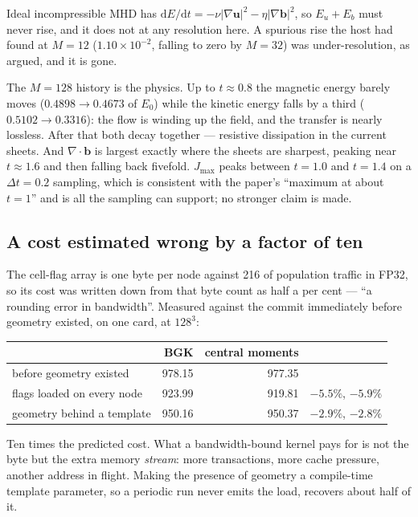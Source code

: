 \documentclass[11pt,a4paper]{article}
\newcommand{\uu}{\bm{u}}
\newcommand{\bb}{\bm{b}}
\newcommand{\e}[1]{\times 10^{#1}}
\begin{document}
Ideal incompressible MHD has $\mathrm{d}E/\mathrm{d}t = -\nu|\nabla\uu|^2 -
\eta|\nabla\bb|^2$, so $E_u + E_b$ must never rise, and it does not at any
resolution here. A spurious rise the host had found at $M=12$ ($1.10\e{-2}$,
falling to zero by $M=32$) was under-resolution, as argued, and it is gone.

The $M=128$ history is the physics. Up to $t\approx0.8$ the magnetic energy barely
moves ($0.4898 \to 0.4673$ of $E_0$) while the kinetic energy falls by a third
($0.5102 \to 0.3316$): the flow is winding up the field, and the transfer is
nearly lossless. After that both decay together --- resistive dissipation in the
current sheets. And $\nabla\!\cdot\!\bb$ is largest exactly where the sheets are
sharpest, peaking near $t\approx1.6$ and then falling back fivefold.
$J_{\max}$ peaks between $t=1.0$ and $t=1.4$ on a $\Delta t = 0.2$ sampling, which
is consistent with the paper's ``maximum at about $t=1$'' and is all the sampling
can support; no stronger claim is made.

\subsection{A cost estimated wrong by a factor of ten}

The cell-flag array is one byte per node against 216 of population traffic in
FP32, so its cost was written down from that byte count as half a per cent --- ``a
rounding error in bandwidth''. Measured against the commit immediately before
geometry existed, on one card, at $128^3$:

\begin{center}\small
\begin{tabular}{lrrr}
\toprule
 & BGK & central moments & \\
\midrule
before geometry existed   & 978.15 & 977.35 & \\
flags loaded on every node& 923.99 & 919.81 & $-5.5\%$, $-5.9\%$ \\
geometry behind a template& 950.16 & 950.37 & $-2.9\%$, $-2.8\%$ \\
\bottomrule
\end{tabular}
\end{center}

\noindent Ten times the predicted cost. What a bandwidth-bound kernel pays for is
not the byte but the extra memory \emph{stream}: more transactions, more cache
pressure, another address in flight. Making the presence of geometry a
compile-time template parameter, so a periodic run never emits the load, recovers
about half of it.
\end{document}
